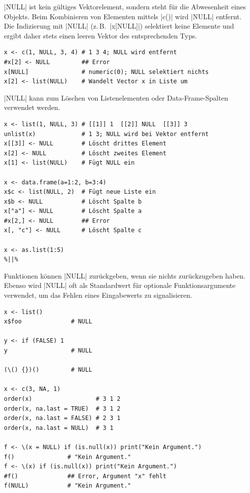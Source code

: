 \documentclass[10pt,twocolumn]{scrartcl}
\renewcommand{\lstinline}{\mycoloredinline}
\begin{document}
\lstinline|NULL| ist kein gültiges Vektorelement, sondern steht für die Abwesenheit eines Objekts. Beim Kombinieren von Elementen mittels \lstinline|c()| wird \lstinline|NULL| entfernt. Die Indizierung mit \lstinline|NULL| (z.\,B.\ \lstinline|x[NULL]|) selektiert keine Elemente und ergibt daher stets einen leeren Vektor des entsprechenden Typs.

\begin{lstlisting}
x <- c(1, NULL, 3, 4) # 1 3 4; NULL wird entfernt
#x[2] <- NULL         ## Error
x[NULL]               # numeric(0); NULL selektiert nichts
x[2] <- list(NULL)    # Wandelt Vector x in Liste um
\end{lstlisting}

\lstinline|NULL| kann zum Löschen von Listenelementen oder Data-Frame-Spalten verwendet werden.

\begin{lstlisting}
x <- list(1, NULL, 3) # [[1]] 1  [[2]] NULL  [[3]] 3
unlist(x)             # 1 3; NULL wird bei Vektor entfernt
x[[3]] <- NULL        # Löscht drittes Element
x[2] <- NULL          # Löscht zweites Element
x[1] <- list(NULL)    # Fügt NULL ein

x <- data.frame(a=1:2, b=3:4)
x$c <- list(NULL, 2)  # Fügt neue Liste ein
x$b <- NULL           # Löscht Spalte b
x["a"] <- NULL        # Löscht Spalte a
#x[2,] <- NULL        ## Error
x[, "c"] <- NULL      # Löscht Spalte c

x <- as.list(1:5)
%||%
\end{lstlisting}

Funktionen können \lstinline|NULL| zurückgeben, wenn sie nichts zurückzugeben haben. Ebenso wird \lstinline|NULL| oft als Standardwert für optionale Funktionsargumente verwendet, um das Fehlen eines Eingabewerts zu signalisieren.

\begin{lstlisting}
x <- list()
x$foo              # NULL

y <- if (FALSE) 1
y                  # NULL

(\() {})()         # NULL

x <- c(3, NA, 1)
order(x)                  # 3 1 2
order(x, na.last = TRUE)  # 3 1 2
order(x, na.last = FALSE) # 2 3 1
order(x, na.last = NULL)  # 3 1

f <- \(x = NULL) if (is.null(x)) print("Kein Argument.")
f()               # "Kein Argument."
f <- \(x) if (is.null(x)) print("Kein Argument.")
#f()              ## Error, Argument "x" fehlt
f(NULL)           # "Kein Argument."
\end{lstlisting}
\end{document}
